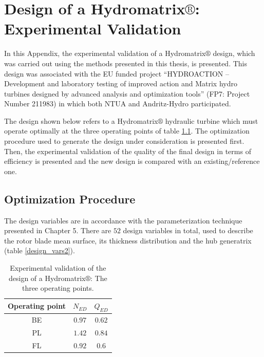 

\ifpdf
    \graphicspath{{8/figures/PNG/}{8/figures/PDF/}{8/figures/}}
\else
    \graphicspath{{8/figures/EPS/}{8/figures/}}
\fi


\chapter{Design of a Hydromatrix$\circledR$: Experimental Validation}

In this Appendix, the experimental validation of a Hydromatrix$\circledR$ design, which was carried out using the methods presented in this thesis, is presented. This design  was associated with the EU funded project ``HYDROACTION – Development and laboratory testing of improved action and Matrix hydro turbines designed by advanced analysis and optimization tools'' (FP7: Project Number 211983) in which both NTUA and Andritz-Hydro participated. 

The design shown below refers to a Hydromatrix$\circledR$ hydraulic turbine which must operate optimally at the three operating points of table \ref{epxer.ops}. The optimization procedure used to generate the design under consideration is presented first. Then, the experimental validation of the quality of the final design in terms of efficiency is presented and the new design is compared with an existing/reference one.  

\section{Optimization Procedure}
The design variables are in accordance with the parameterization technique presented in Chapter 5. There are $52$ design variables in total, used to describe the rotor blade mean surface, its thickness distribution and the hub generatrix (table \ref{design_vars2}). 



\begin{table}[h!]
\begin{center}
\begin{tabular}{ |c|c|c| }
\hline
Operating point & $N_{ED}$ & $Q_{ED}$\\
\hline
BE & $0.97$ & $0.62$\\
\hline
PL       & $1.42$ & $0.84$\\
\hline
FL       & $0.92$ & $0.6$\\
\hline
\end{tabular}
\caption{Experimental validation of the design of a Hydromatrix$\circledR$: The three operating points.}
\label{epxer.ops}
\end{center}
\end{table}

